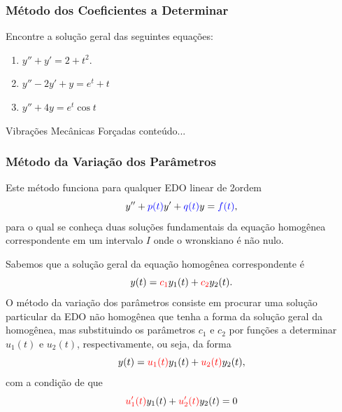 \begin{frame}
\frametitle{Método dos Coeficientes a Determinar }


\end{frame}

\begin{frame}
\begin{exe} Encontre a solução geral das seguintes equações:
\begin{enumerate}[a]
\item $y''+y'=2+t^2$.
\item $y''-2y'+y=e^{t}+t$
\item $y''+4y=e^t\cos t$

\end{enumerate}
\end{exe}
\end{frame}


\begin{frame}{Vibrações Mecânicas Forçadas}
conteúdo...
\end{frame}



\begin{frame}
\frametitle{ Método da Variação dos Parâmetros}

Este método funciona para qualquer EDO linear de 2\fm ordem 
\[y''+{\color{blue}p(t)}y'+{\color{blue}q(t)}y={\color{blue}f(t)},\]
para o qual se conheça duas soluções fundamentais da equação homogênea correspondente em um intervalo $I$ onde o wronskiano é não nulo.
\bigskip

Sabemos que a solução geral da equação homogênea correspondente é
$$y(t)={\color{red}c_1}y_1(t)+{\color{red}c_2}y_2(t).$$
O método da variação dos parâmetros consiste em procurar uma solução particular da EDO não homogênea que tenha  a forma da solução geral da homogênea, mas substituindo os parâmetros $c_1$ e $c_2$ por funções a determinar $u_1(t)$ e $u_2(t)$, respectivamente, ou seja, da forma
\[y(t)={\color{red}u_1(t)}y_1(t)+{\color{red}u_2(t)}y_2(t),\]
com a condição de que
\[{\color{red}u'_1(t)}y_1(t)+{\color{red}u'_2(t)}y_2(t)=0\]

\end{frame}

